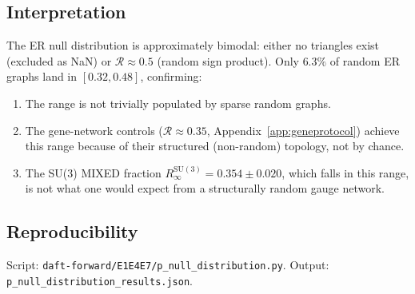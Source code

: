 \documentclass[12pt,a4paper]{article}
\newcommand{\R}{\mathcal{R}}           %
\newcommand{\SU}[1]{\mathrm{SU}(#1)}
\theoremstyle{plain}
\theoremstyle{definition}
\theoremstyle{remark}
\begin{document}
\subsection*{Interpretation}

The ER null distribution is approximately bimodal: either no triangles exist (excluded
as NaN) or $\R\approx0.5$ (random sign product).
Only $6.3\%$ of random ER graphs land in $[0.32,0.48]$, confirming:
\begin{enumerate}
  \item The range is not trivially populated by sparse random graphs.
  \item The gene-network controls ($\R\approx0.35$, Appendix~\ref{app:geneprotocol})
        achieve this range because of their structured (non-random) topology, not by
        chance.
  \item The SU(3) MIXED fraction $R_\infty^{\SU{3}}=0.354\pm0.020$, which falls in
        this range, is not what one would expect from a structurally random gauge
        network.
\end{enumerate}

\subsection*{Reproducibility}

Script: \texttt{daft-forward/E1E4E7/p\_null\_distribution.py}.
Output: \texttt{p\_null\_distribution\_results.json}.
\end{document}
